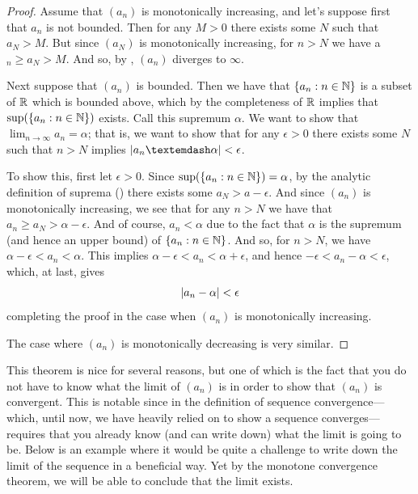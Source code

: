 \documentclass[11pt,twoside=off,numbers=noenddot]{scrbook}
\begin{document}
\begin{proof}
  Assume that $(a_n)$ is monotonically increasing, and let's suppose
  first that $a_n$ is not bounded. Then for any $M > 0$ there exists
  some $N$ such that $a_N > M$. But since $(a_N)$ is monotonically
  increasing, for $n > N$ we have a$_n \geq a_N > M$. And so, by
  , $(a_n)$ diverges to $\infty$.

  Next suppose that $(a_n)$ is bounded. Then we have that $\{ a_n :
  n \in \mathbb N \}$ is a subset of $\mathbb R$ which is bounded above, which by
  the completeness of $\mathbb R$ implies that $\sup(\{ a_n : n \in
  \mathbb N \})$ exists. Call this supremum $\alpha$. We want to show that
  $\lim_{n \to \infty} a_n = \alpha$; that is, we want to show that
  for any $\epsilon > 0$ there exists some $N$ such that $n > N$
  implies $\size{a_n — \alpha} < \epsilon$.

  To show this, first let $\epsilon > 0$. Since $\sup(\{ a_n : n
  \in \mathbb N \}) = \alpha$, by the analytic definition of suprema
  () there exists some $a_N > a -
  \epsilon$. And since $(a_n)$ is monotonically increasing, we see
  that for any $n > N$ we have that $a_n \geq a_N > \alpha -
  \epsilon$. And of course, $a_n < \alpha$ due to the fact that
  $\alpha$ is the supremum (and hence an upper bound) of $\{ a_n :
  n \in \mathbb N \}$. And so, for $n > N$, we have $\alpha - \epsilon < a_n
  < \alpha$. This implies $\alpha - \epsilon < a_n < \alpha +
  \epsilon$, and hence $-\epsilon < a_n - \alpha < \epsilon$, which,
  at last, gives
  \[ | a_n - \alpha | < \epsilon \]
  completing the proof in the case when $(a_n)$ is monotonically increasing.

  The case where $(a_n)$ is monotonically decreasing is very similar.
\end{proof}

\begin{remark}
  This theorem is nice for several reasons, but one of which is the
  fact that you do not have to know what the limit of $(a_n)$ is in
  order to show that $(a_n)$ is convergent. This is notable since in
  the definition of sequence convergence---which, until now, we have
  heavily relied on to show a sequence converges---requires that you
  already know (and can write down) what the limit is going to be.
  Below is an example where it would be quite a challenge to write
  down the limit of the sequence in a beneficial way. Yet by the
  monotone convergence theorem, we will be able to conclude that the
  limit exists.
\end{remark}
\end{document}
